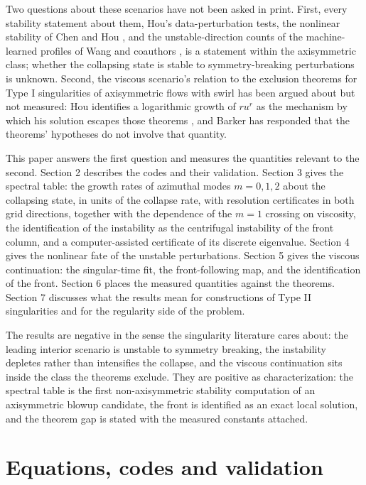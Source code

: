 \documentclass[11pt]{article}
\begin{document}
Two questions about these scenarios have not been asked in print. First, every stability statement about them, Hou's data-perturbation tests, the nonlinear stability of Chen and Hou \cite{CH25}, and the unstable-direction counts of the machine-learned profiles of Wang and coauthors \cite{WLGB23,W25}, is a statement within the axisymmetric class; whether the collapsing state is stable to symmetry-breaking perturbations is unknown. Second, the viscous scenario's relation to the exclusion theorems for Type I singularities of axisymmetric flows with swirl \cite{CSTY09,KNSS09,SS09} has been argued about but not measured: Hou identifies a logarithmic growth of $r u^r$ as the mechanism by which his solution escapes those theorems \cite{H24}, and Barker \cite{B25} has responded that the theorems' hypotheses do not involve that quantity.

This paper answers the first question and measures the quantities relevant to the second. Section 2 describes the codes and their validation. Section 3 gives the spectral table: the growth rates of azimuthal modes $m = 0, 1, 2$ about the collapsing state, in units of the collapse rate, with resolution certificates in both grid directions, together with the dependence of the $m = 1$ crossing on viscosity, the identification of the instability as the centrifugal instability of the front column, and a computer-assisted certificate of its discrete eigenvalue. Section 4 gives the nonlinear fate of the unstable perturbations. Section 5 gives the viscous continuation: the singular-time fit, the front-following map, and the identification of the front. Section 6 places the measured quantities against the theorems. Section 7 discusses what the results mean for constructions of Type II singularities and for the regularity side of the problem.

The results are negative in the sense the singularity literature cares about: the leading interior scenario is unstable to symmetry breaking, the instability depletes rather than intensifies the collapse, and the viscous continuation sits inside the class the theorems exclude. They are positive as characterization: the spectral table is the first non-axisymmetric stability computation of an axisymmetric blowup candidate, the front is identified as an exact local solution, and the theorem gap is stated with the measured constants attached.

\section{Equations, codes and validation}
\end{document}
